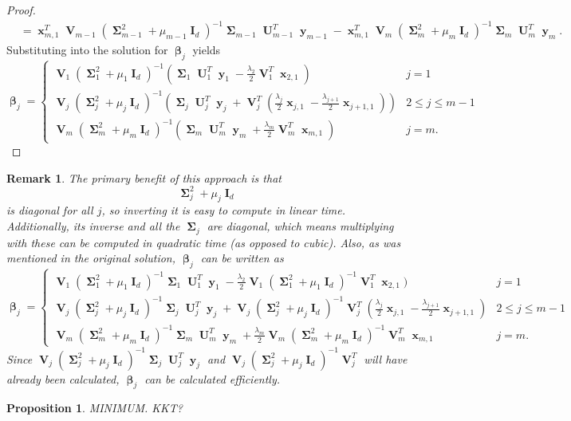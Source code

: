 \documentclass[12pt]{article}
\DeclareMathOperator{\bx}{\textbf{x}}
\DeclareMathOperator{\by}{\textbf{y}}
\DeclareMathOperator{\bI}{\textbf{I}}
\DeclareMathOperator{\bU}{\textbf{U}}
\DeclareMathOperator{\bV}{\textbf{V}}
\DeclareMathOperator{\bbeta}{\boldsymbol{\beta}}
\DeclareMathOperator{\bSigma}{\mathbf{\Sigma}}
\newtheorem{prop}{Proposition}
\newtheorem*{remark}{Remark}
\begin{document}
\begin{proof}
\begin{align*}
& = \bx_{m,1}^T\bV_{m-1}(\bSigma_{m-1}^2+\mu_{m-1}\bI_d)^{-1}\bSigma_{m-1} \bU_{m-1}^T \by_{m-1}-\bx_{m,1}^T\bV_{m}(\bSigma_{m}^2+\mu_{m}\bI_d)^{-1}\bSigma_m \bU_m^T\by_m.
\end{align*}
Substituting into the solution for $\bbeta_j$ yields
\begin{equation} \label{eqn:beta_svd}
\bbeta_j=\begin{cases}
\bV_1(\bSigma_1^2+\mu_1\bI_d)^{-1}(\bSigma_1 \bU_1^T \by_1 -\frac{\lambda_{2}}{2}\bV_1^T\bx_{2, 1}) & j=1 \\
\bV_j(\bSigma_j^2+\mu_j\bI_d)^{-1}(\bSigma_j \bU_j^T \by_j + \bV_j^T(\frac{\lambda_j}{2}\bx_{j, 1}-\frac{\lambda_{j+1}}{2}\bx_{j+1, 1})) & 2 \leq j \leq m-1 \\
\bV_m(\bSigma_m^2+\mu_m\bI_d)^{-1}(\bSigma_m \bU_m^T \by_m + \frac{\lambda_m}{2}\bV_m^T\bx_{m, 1}) & j=m. \end{cases}
\end{equation}
\end{proof}
\begin{remark}
The primary benefit of this approach is that 
$$\bSigma_j^2+\mu_j\bI_d$$
is diagonal for all $j$, so inverting it is easy to compute in linear time. Additionally, its inverse and all the $\bSigma_j$ are diagonal, which means multiplying with these can be computed in quadratic time (as opposed to cubic). Also, as was mentioned in the original solution, $\bbeta_j$ can be written as 
$$\bbeta_j=\begin{cases}
\bV_1(\bSigma_1^2+\mu_1\bI_d)^{-1}\bSigma_1 \bU_1^T \by_1 -\frac{\lambda_{2}}{2}\bV_1(\bSigma_1^2+\mu_1\bI_d)^{-1}\bV_1^T\bx_{2, 1}) & j=1 \\
\bV_j(\bSigma_j^2+\mu_j\bI_d)^{-1}\bSigma_j \bU_j^T \by_j + \bV_j(\bSigma_j^2+\mu_j\bI_d)^{-1}\bV_j^T(\frac{\lambda_j}{2}\bx_{j, 1}-\frac{\lambda_{j+1}}{2}\bx_{j+1, 1}) & 2 \leq j \leq m-1 \\
\bV_m(\bSigma_m^2+\mu_m\bI_d)^{-1}\bSigma_m \bU_m^T \by_m + \frac{\lambda_m}{2}\bV_m(\bSigma_m^2+\mu_m\bI_d)^{-1}\bV_m^T\bx_{m, 1} & j=m. \end{cases}$$
Since $\bV_j(\bSigma_j^2+\mu_j\bI_d)^{-1}\bSigma_j \bU_j^T \by_j$ and $\bV_j(\bSigma_j^2+\mu_j\bI_d)^{-1}\bV_j^T$ will have already been calculated, $\bbeta_j$ can be calculated efficiently.
\end{remark}

\begin{prop}
MINIMUM. KKT?
\end{prop}
\end{document}
